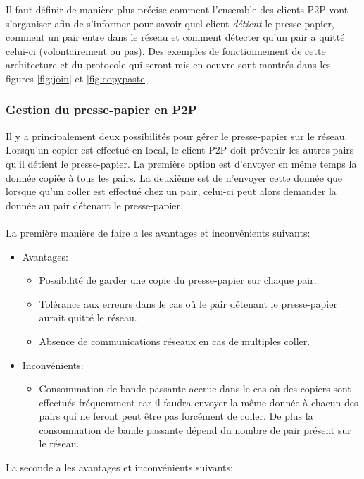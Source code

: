 Il faut définir de manière plus précise comment l'ensemble des clients P2P
vont s'organiser afin de s'informer pour savoir quel client \emph{détient} le
presse-papier, comment un pair entre dans le réseau et comment détecter
qu'un pair a quitté celui-ci (volontairement ou pas). Des exemples
de fonctionnement de cette architecture et du protocole qui seront mis en
oeuvre sont montrés dans les figures \ref{fig:join} et \ref{fig:copypaste}.

\subsubsection*{Gestion du presse-papier en P2P}
Il y a principalement deux possibilités pour gérer le presse-papier
sur le réseau. Lorsqu'un copier est effectué en local, le client P2P
doit prévenir les autres pairs qu'il détient le presse-papier.
La première option est d'envoyer en même temps la donnée copiée à tous les
pairs. La deuxième est de n'envoyer cette donnée que lorsque qu'un coller
est effectué chez un pair, celui-ci peut alors demander la donnée au pair
détenant le presse-papier.\\\\
La première manière de faire a les avantages et inconvénients suivants:
\begin{itemize}
\item Avantages:
  \begin{itemize}
  \item Possibilité de garder une copie du presse-papier sur chaque pair.
  \item Tolérance aux erreurs dans le cas où le pair détenant le presse-papier
    aurait quitté le réseau.
  \item Absence de communications réseaux en cas de multiples coller.
  \end{itemize}
\item Inconvénients:
  \begin{itemize}
  \item Consommation de bande passante accrue dans le cas où des copiers
    sont effectués fréquemment car il faudra envoyer la même donnée à chacun
    des pairs qui ne feront peut être pas forcément de coller. De plus la
    consommation de bande passante dépend du nombre de pair présent sur le
    réseau.
  \end{itemize}
\end{itemize}
La seconde a les avantages et inconvénients suivants:
